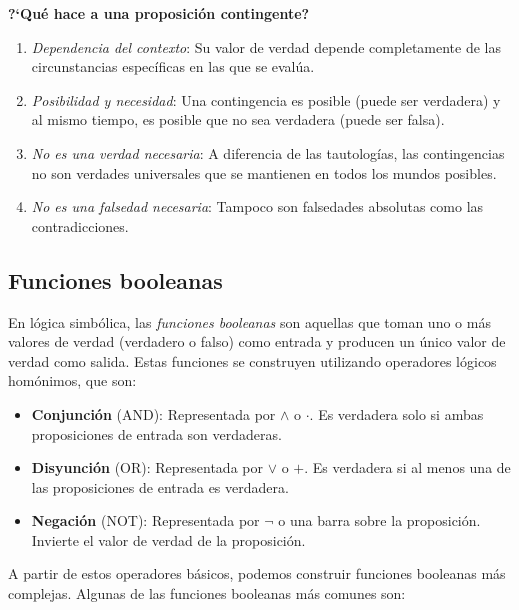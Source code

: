 \textbf{?`Qué hace a una proposición contingente?}

\begin{enumerate}
	\item \textit{Dependencia del contexto}: Su valor de verdad depende completamente de las circunstancias específicas en las que se evalúa.
	\item \textit{Posibilidad y necesidad}: Una contingencia es posible (puede ser verdadera) y al mismo tiempo, es posible que no sea verdadera (puede ser falsa).
	\item \textit{No es una verdad necesaria}: A diferencia de las tautologías, las contingencias no son verdades universales que se mantienen en todos los mundos posibles.
	\item \textit{No es una falsedad necesaria}: Tampoco son falsedades absolutas como las contradicciones.
\end{enumerate}

\subsection{Funciones booleanas}
En lógica simbólica, las \textit{funciones booleanas} son aquellas que toman uno o más valores de verdad (verdadero o falso) como entrada y producen un único valor de verdad como salida. Estas funciones se construyen utilizando operadores lógicos homónimos, que son:

\begin{itemize}
	\item \textbf{Conjunción} (AND): Representada por $\land$ o $\cdot$. Es verdadera solo si ambas proposiciones de entrada son verdaderas.
	\item \textbf{Disyunción} (OR): Representada por $\lor$ o $+$. Es verdadera si al menos una de las proposiciones de entrada es verdadera.
	\item \textbf{Negación} (NOT): Representada por $\neg$ o una barra sobre la proposición. Invierte el valor de verdad de la proposición.
\end{itemize}

A partir de estos operadores básicos, podemos construir funciones booleanas más complejas. Algunas de las funciones booleanas más comunes son:

